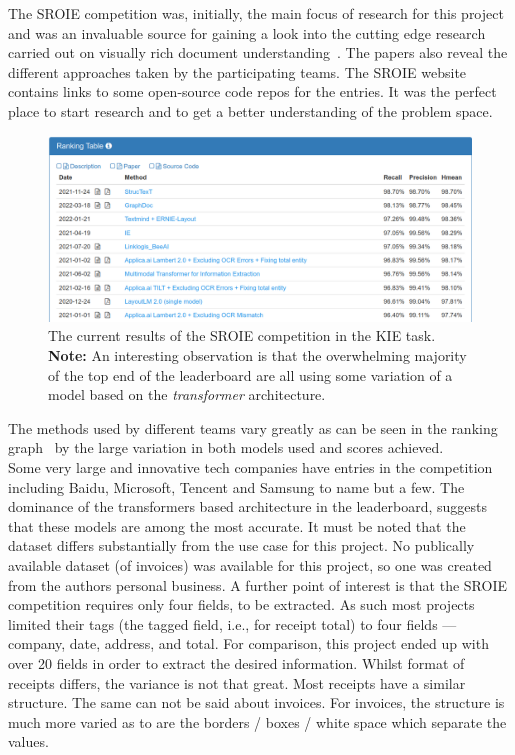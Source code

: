 The SROIE competition was, initially, the main focus of research for this project and was an invaluable source for gaining a look into the cutting
edge research carried out on visually rich document understanding~\autocite{MethodStrucTexTTask}. The papers also reveal the different approaches taken by
the participating teams.
\bigbreak
The SROIE website contains links to some open-source code repos for the entries. It was the perfect place to start research and to get a better
understanding of the problem space.
\begin{figure}[H]
	\centering
	\includegraphics[width=1\linewidth]{figures/SROIE_results.png}
	\caption[SROIE Results (KIE)]{The current results of the SROIE competition in the KIE task.\\
		\textbf{Note:} An interesting observation is that the overwhelming majority of the top end of the leaderboard are all using some variation of a model
		based on the \emph{transformer} architecture.}
	\label{fig:SROIE_results}
\end{figure}
The methods used by different teams vary greatly as can be seen in the ranking graph~\autocite{ResultsICDAR2019} by the large variation in both models
used and scores achieved.\\
Some very large and innovative tech companies have entries in the competition including Baidu, Microsoft, Tencent and Samsung to name but a few.
The dominance of the transformers based architecture in the leaderboard, suggests that these models are among the most accurate.
\bigbreak
It must be noted that the dataset differs substantially from the use case for this project. No publically available dataset (of invoices) was available for
this project, so one was created from the authors personal business.
\bigbreak
A further point of interest is that the SROIE competition requires only four fields, to be extracted. As such most projects limited their
tags (the tagged field, i.e.,  for receipt total) to four fields --- company, date, address, and total. For comparison, this project
ended up with over 20 fields in order to extract the desired information.
\bigbreak
Whilst format of receipts differs, the variance is not that great. Most receipts have a similar structure. The same can not be said about
invoices. For invoices, the structure is much more varied as to are the borders / boxes / white space which separate the values.
